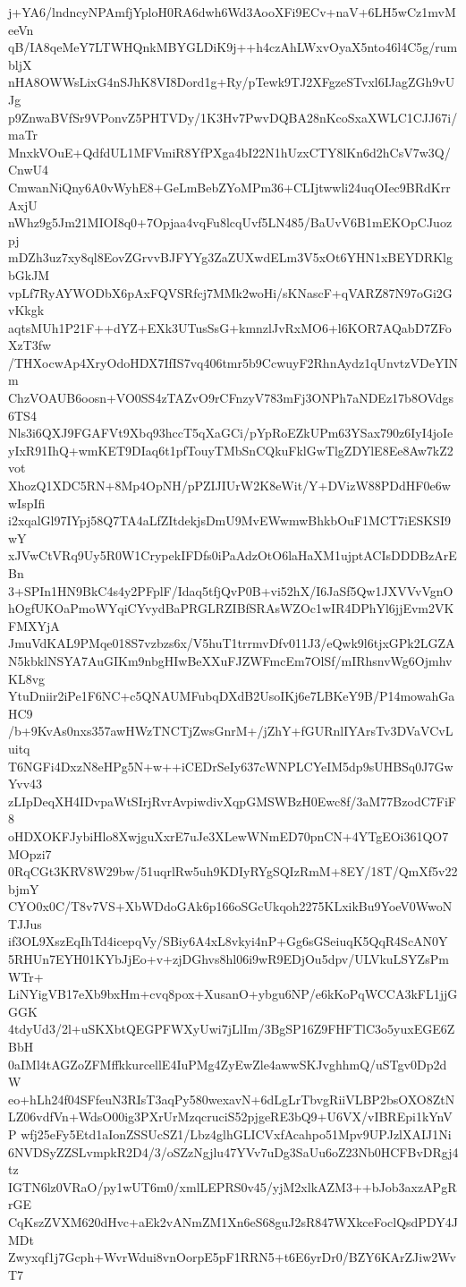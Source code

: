 j+YA6/lndncyNPAmfjYploH0RA6dwh6Wd3AooXFi9ECv+naV+6LH5wCz1mvMeeVn
qB/IA8qeMeY7LTWHQnkMBYGLDiK9j++h4czAhLWxvOyaX5nto46l4C5g/rumbljX
nHA8OWWsLixG4nSJhK8VI8Dord1g+Ry/pTewk9TJ2XFgzeSTvxl6IJagZGh9vUJg
p9ZnwaBVfSr9VPonvZ5PHTVDy/1K3Hv7PwvDQBA28nKcoSxaXWLC1CJJ67i/maTr
MnxkVOuE+QdfdUL1MFVmiR8YfPXga4bI22N1hUzxCTY8lKn6d2hCsV7w3Q/CnwU4
CmwanNiQny6A0vWyhE8+GeLmBebZYoMPm36+CLIjtwwli24uqOIec9BRdKrrAxjU
nWhz9g5Jm21MIOI8q0+7Opjaa4vqFu8lcqUvf5LN485/BaUvV6B1mEKOpCJuozpj
mDZh3uz7xy8ql8EovZGrvvBJFYYg3ZaZUXwdELm3V5xOt6YHN1xBEYDRKlgbGkJM
vpLf7RyAYWODbX6pAxFQVSRfcj7MMk2woHi/sKNascF+qVARZ87N97oGi2GvKkgk
aqtsMUh1P21F++dYZ+EXk3UTusSsG+kmnzlJvRxMO6+l6KOR7AQabD7ZFoXzT3fw
/THXocwAp4XryOdoHDX7IfIS7vq406tmr5b9CcwuyF2RhnAydz1qUnvtzVDeYINm
ChzVOAUB6oosn+VO0SS4zTAZvO9rCFnzyV783mFj3ONPh7aNDEz17b8OVdgs6TS4
Nls3i6QXJ9FGAFVt9Xbq93hccT5qXaGCi/pYpRoEZkUPm63YSax790z6IyI4joIe
yIxR91IhQ+wmKET9DIaq6t1pfTouyTMbSnCQkuFklGwTlgZDYlE8Ee8Aw7kZ2vot
XhozQ1XDC5RN+8Mp4OpNH/pPZIJIUrW2K8eWit/Y+DVizW88PDdHF0e6wwIspIfi
i2xqalGl97IYpj58Q7TA4aLfZItdekjsDmU9MvEWwmwBhkbOuF1MCT7iESKSI9wY
xJVwCtVRq9Uy5R0W1CrypekIFDfs0iPaAdzOtO6laHaXM1ujptACIsDDDBzArEBn
3+SPIn1HN9BkC4s4y2PFplF/Idaq5tfjQvP0B+vi52hX/I6JaSf5Qw1JXVVvVgnO
hOgfUKOaPmoWYqiCYvydBaPRGLRZIBfSRAsWZOc1wIR4DPhYl6jjEvm2VKFMXYjA
JmuVdKAL9PMqe018S7vzbzs6x/V5huT1trrmvDfv011J3/eQwk9l6tjxGPk2LGZA
N5kbklNSYA7AuGIKm9nbgHIwBeXXuFJZWFmcEm7OlSf/mIRhsnvWg6OjmhvKL8vg
YtuDniir2iPe1F6NC+c5QNAUMFubqDXdB2UsoIKj6e7LBKeY9B/P14mowahGaHC9
/b+9KvAs0nxs357awHWzTNCTjZwsGnrM+/jZhY+fGURnlIYArsTv3DVaVCvLuitq
T6NGFi4DxzN8eHPg5N+w++iCEDrSeIy637cWNPLCYeIM5dp9sUHBSq0J7GwYvv43
zLIpDeqXH4IDvpaWtSIrjRvrAvpiwdivXqpGMSWBzH0Ewc8f/3aM77BzodC7FiF8
oHDXOKFJybiHlo8XwjguXxrE7uJe3XLewWNmED70pnCN+4YTgEOi361QO7MOpzi7
0RqCGt3KRV8W29bw/51uqrlRw5uh9KDIyRYgSQIzRmM+8EY/18T/QmXf5v22bjmY
CYO0x0C/T8v7VS+XbWDdoGAk6p166oSGcUkqoh2275KLxikBu9YoeV0WwoNTJJus
if3OL9XszEqIhTd4icepqVy/SBiy6A4xL8vkyi4nP+Gg6sGSeiuqK5QqR4ScAN0Y
5RHUn7EYH01KYbJjEo+v+zjDGhvs8hl06i9wR9EDjOu5dpv/ULVkuLSYZsPmWTr+
LiNYigVB17eXb9bxHm+cvq8pox+XusanO+ybgu6NP/e6kKoPqWCCA3kFL1jjGGGK
4tdyUd3/2l+uSKXbtQEGPFWXyUwi7jLlIm/3BgSP16Z9FHFTlC3o5yuxEGE6ZBbH
0aIMl4tAGZoZFMffkkurcellE4IuPMg4ZyEwZle4awwSKJvghhmQ/uSTgv0Dp2dW
eo+hLh24f04SFfeuN3RIsT3aqPy580wexavN+6dLgLrTbvgRiiVLBP2bsOXO8ZtN
LZ06vdfVn+WdsO00ig3PXrUrMzqcruciS52pjgeRE3bQ9+U6VX/vIBREpi1kYnVP
wfj25eFy5Etd1aIonZSSUcSZ1/Lbz4glhGLICVxfAcahpo51Mpv9UPJzlXAIJ1Ni
6NVDSyZZSLvmpkR2D4/3/oSZzNgjlu47YVv7uDg3SaUu6oZ23Nb0HCFBvDRgj4tz
IGTN6lz0VRaO/py1wUT6m0/xmlLEPRS0v45/yjM2xlkAZM3++bJob3axzAPgRrGE
CqKszZVXM620dHvc+aEk2vANmZM1Xn6eS68guJ2sR847WXkceFoclQsdPDY4JMDt
Zwyxqf1j7Gcph+WvrWdui8vnOorpE5pF1RRN5+t6E6yrDr0/BZY6KArZJiw2WvT7
